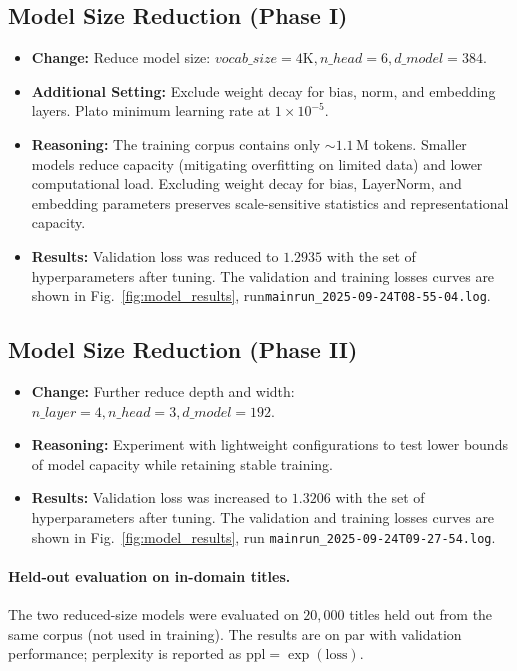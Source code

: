 \documentclass[12pt]{article}
\begin{document}
\subsection{Model Size Reduction (Phase I)}
\begin{itemize}
  \item \textbf{Change:} Reduce model size: $vocab\_size = 4\text{K}, n\_head = 6, d\_model = 384$.
  \item \textbf{Additional Setting:} Exclude weight decay for bias, norm, and embedding layers. Plato minimum learning rate at $1\times 10^{-5}$.
  \item \textbf{Reasoning:} The training corpus contains only $\sim\!1.1\,\mathrm{M}$ tokens. Smaller models reduce capacity (mitigating overfitting on limited data) and lower computational load. Excluding weight decay for bias, LayerNorm, and embedding parameters preserves scale-sensitive statistics and representational capacity.
  \item \textbf{Results:} Validation loss was reduced to $1.2935$ with the set of hyperparameters after tuning. The validation and training losses curves are shown in Fig.~\ref{fig:model_results},  run\texttt{mainrun\_2025-09-24T08-55-04.log}.
\end{itemize}

\subsection{Model Size Reduction (Phase II)}
\begin{itemize}
  \item \textbf{Change:} Further reduce depth and width: $n\_layer = 4, n\_head = 3, d\_model = 192$.
  \item \textbf{Reasoning:} Experiment with lightweight configurations to test lower bounds of model capacity while retaining stable training.
  \item \textbf{Results:} Validation loss was increased to $1.3206$ with the set of hyperparameters after tuning.  The validation and training losses curves are shown in Fig.~\ref{fig:model_results},  run \texttt{mainrun\_2025-09-24T09-27-54.log}.
\end{itemize}

\paragraph{Held-out evaluation on in-domain titles.}
The two reduced-size models were evaluated on $20{,}000$ titles held out from the same corpus (not used in training). The results are on par with validation performance; perplexity is reported as $\mathrm{ppl}=\exp(\text{loss})$.
\end{document}
